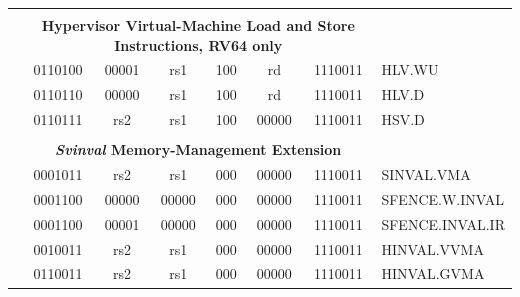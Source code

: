 \documentclass{../runikraft-report}
\begin{document}
{\begin{longtable}{p{0in}p{0.4in}p{0.05in}p{0.05in}p{0.05in}p{0.05in}p{0.4in}p{0.6in}p{0.4in}p{0.6in}p{0.7in}l}
    &
    \multicolumn{10}{c}{} & \\
    &
    \multicolumn{10}{c}{\bf Hypervisor Virtual-Machine Load and Store Instructions, RV64 only} & \\
    \cline{2-11}


    &
    \multicolumn{4}{|c|}{0110100} &
    \multicolumn{2}{c|}{00001} &
    \multicolumn{1}{c|}{rs1} &
    \multicolumn{1}{c|}{100} &
    \multicolumn{1}{c|}{rd} &
    \multicolumn{1}{c|}{1110011} & HLV.WU \\
    \cline{2-11}


    &
    \multicolumn{4}{|c|}{0110110} &
    \multicolumn{2}{c|}{00000} &
    \multicolumn{1}{c|}{rs1} &
    \multicolumn{1}{c|}{100} &
    \multicolumn{1}{c|}{rd} &
    \multicolumn{1}{c|}{1110011} & HLV.D \\
    \cline{2-11}


    &
    \multicolumn{4}{|c|}{0110111} &
    \multicolumn{2}{c|}{rs2} &
    \multicolumn{1}{c|}{rs1} &
    \multicolumn{1}{c|}{100} &
    \multicolumn{1}{c|}{00000} &
    \multicolumn{1}{c|}{1110011} & HSV.D \\
    \cline{2-11}


    &
    \multicolumn{10}{c}{} & \\
    &
    \multicolumn{10}{c}{\bf \emph{Svinval} Memory-Management Extension} & \\
    \cline{2-11}


    &
    \multicolumn{4}{|c|}{0001011} &
    \multicolumn{2}{c|}{rs2} &
    \multicolumn{1}{c|}{rs1} &
    \multicolumn{1}{c|}{000} &
    \multicolumn{1}{c|}{00000} &
    \multicolumn{1}{c|}{1110011} & SINVAL.VMA \\
    \cline{2-11}


    &
    \multicolumn{4}{|c|}{0001100} &
    \multicolumn{2}{c|}{00000} &
    \multicolumn{1}{c|}{00000} &
    \multicolumn{1}{c|}{000} &
    \multicolumn{1}{c|}{00000} &
    \multicolumn{1}{c|}{1110011} & SFENCE.W.INVAL \\
    \cline{2-11}


    &
    \multicolumn{4}{|c|}{0001100} &
    \multicolumn{2}{c|}{00001} &
    \multicolumn{1}{c|}{00000} &
    \multicolumn{1}{c|}{000} &
    \multicolumn{1}{c|}{00000} &
    \multicolumn{1}{c|}{1110011} & SFENCE.INVAL.IR \\
    \cline{2-11}


    &
    \multicolumn{4}{|c|}{0010011} &
    \multicolumn{2}{c|}{rs2} &
    \multicolumn{1}{c|}{rs1} &
    \multicolumn{1}{c|}{000} &
    \multicolumn{1}{c|}{00000} &
    \multicolumn{1}{c|}{1110011} & HINVAL.VVMA \\
    \cline{2-11}


    &
    \multicolumn{4}{|c|}{0110011} &
    \multicolumn{2}{c|}{rs2} &
    \multicolumn{1}{c|}{rs1} &
    \multicolumn{1}{c|}{000} &
    \multicolumn{1}{c|}{00000} &
    \multicolumn{1}{c|}{1110011} & HINVAL.GVMA \\
    \cline{2-11}


    \end{longtable}
}
\end{document}
